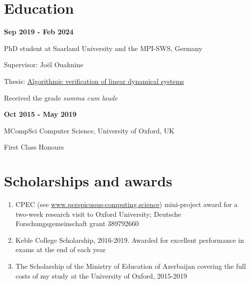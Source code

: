 \documentclass{article}
\begin{document}
	\section*{Education}
		\begin{minipage}{0.3\textwidth}
			\hspace{0.1cm} \textbf{Sep 2019 - Feb 2024}
		\end{minipage}
		\vspace*{0.25cm}
		\begin{minipage}{0.7\textwidth}
			PhD student at Saarland University and the MPI-SWS, Germany
			
			\vspace*{0.2cm}
			Supervisor: Jo\"el Ouaknine 
			
			\vspace*{0.2cm}
			Thesis: \href{https://publikationen.sulb.uni-saarland.de/handle/20.500.21880/37285}{Algorithmic verification of linear dynamical systems}
			
			\vspace*{0.2cm}
			Received the grade \emph{summa cum laude}
                \vspace{0.3cm}
		\end{minipage}
		\vspace{0.85cm}
		\begin{minipage}{0.3\textwidth}
		\hspace{0.1 cm} \textbf{Oct 2015 - May 2019}
	\end{minipage}
	\begin{minipage}{0.7\textwidth}
		MCompSci Computer Science, University of Oxford, UK
		
		\vspace*{0.2cm}
		First Class Honours
	\end{minipage}
	
	\section*{Scholarships and awards}
	\begin{enumerate}
		\item CPEC (see \url{www.perspicuous-computing.science}) mini-project award for a two-week research visit to Oxford University; Deutsche Forschungsgemeinschaft grant 389792660
		\item Keble College Scholarship, 2016-2019. Awarded for excellent performance in exams at the end of each year
		\item The Scholarship of the Ministry of Education of Azerbaijan covering the full costs of my study at the University of Oxford, 2015-2019
	\end{enumerate}
	
\end{document}
